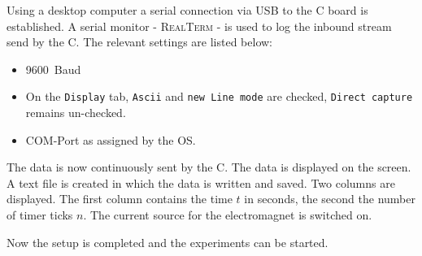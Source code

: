 %
Using a desktop computer a serial connection via USB to the \micro C board is established. A serial monitor - \textsc{RealTerm} - is used to
log the inbound stream send by the \micro C. The relevant settings are listed below:\par
\begin{itemize}
	\item \SI{9600}{Baud}
    \item On the \texttt{Display} tab, \texttt{Ascii} and \texttt{new Line mode} are checked, \texttt{Direct capture}
    remains un-checked.
	\item COM-Port as assigned by the OS.
\end{itemize}
%
The data is now continuously sent by the \micro C. The data is displayed on the screen. A text file is created in
which the data is written and saved. Two columns are displayed. The first column contains the time $t$ in seconds, the
second the number of timer ticks $n$. The current source for the electromagnet is switched on.\par
Now the setup is completed and the experiments can be started.
%